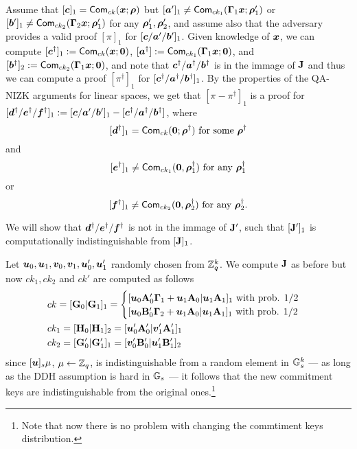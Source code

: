 Assume that $[{\boldsymbol{c}}]_1 = \mathsf{Com}_{ck}({\boldsymbol{x}};{\boldsymbol{\rho}})$ but $[{\boldsymbol{a}}']_1\neq \mathsf{Com}_{ck_1}(\mathbf{{\Gamma}}_1{\boldsymbol{x}};{\boldsymbol{\rho}}'_1)$ or $[{\boldsymbol{b}}']_1\neq \mathsf{Com}_{ck_2}(\mathbf{{\Gamma}}_2{\boldsymbol{x}};{\boldsymbol{\rho}}'_1)$ for any ${\boldsymbol{\rho}}'_1,{\boldsymbol{\rho}}'_2$, and assume also that the adversary provides a valid proof $[\pi]_1$ for $[{\boldsymbol{c}}/{\boldsymbol{a}}'/{\boldsymbol{b}}']_1$. Given knowledge of ${\boldsymbol{x}}$, we can compute $[{\boldsymbol{c}}^\dag]_1:=\mathsf{Com}_{ck}({\boldsymbol{x}};{\boldsymbol{0}})$, $[{\boldsymbol{a}}^\dag]:=\mathsf{Com}_{ck_1}(\mathbf{{\Gamma}}_1{\boldsymbol{x}};{\boldsymbol{0}})$, and $[{\boldsymbol{b}}^\dag]_2:=\mathsf{Com}_{ck_2}(\mathbf{{\Gamma}}_1{\boldsymbol{x}};{\boldsymbol{0}})$, and note that ${\boldsymbol{c}}^\dag/{\boldsymbol{a}}^\dag/{\boldsymbol{b}}^\dag$ is in the immage of $\mathbf{{J}}$ and thus we can compute a proof $[\pi^\dag]_1$ for $[{\boldsymbol{c}}^\dag/{\boldsymbol{a}}^\dag/{\boldsymbol{b}}^\dag]_1$. By the properties of the QA-NIZK arguments for linear spaces, we get that $[\pi-\pi^\dag]_1$ is a proof for $[{\boldsymbol{d}}^\dag/{\boldsymbol{e}}^\dag/{\boldsymbol{f}}^\dag]_1:=[{\boldsymbol{c}}/{\boldsymbol{a}}'/{\boldsymbol{b}}']_1-[{\boldsymbol{c}}^\dag/{\boldsymbol{a}}^\dag/{\boldsymbol{b}}^\dag]$, where
$$[{\boldsymbol{d}}^\dag]_1 = \mathsf{Com}_{ck}({\boldsymbol{0}};{\boldsymbol{\rho}}^\dag)\text{ for some }{\boldsymbol{\rho}}^\dag$$
and
$$[{\boldsymbol{e}}^\dag]_1 \neq\mathsf{Com}_{ck_1}({\boldsymbol{0}},{\boldsymbol{\rho}}^\dag_1) \text{ for any }{\boldsymbol{\rho}}^\dag_1$$ 
or
$$[{\boldsymbol{f}}^\dag]_1 \neq\mathsf{Com}_{ck_2}({\boldsymbol{0}},{\boldsymbol{\rho}}^\dag_2) \text{ for any }{\boldsymbol{\rho}}_2^\dag.$$

We will show that ${\boldsymbol{d}}^\dag/ {\boldsymbol{e}}^\dag/ {\boldsymbol{f}}^\dag$ is not in the immage of $\mathbf{{J}}'$, such that $[\mathbf{{J}}']_1$ is computationally indistinguishable from $[\mathbf{{J}}]_1$.

Let ${\boldsymbol{u}}_0,{\boldsymbol{u}}_1,{\boldsymbol{v}}_0,{\boldsymbol{v}}_1,{\boldsymbol{u}}'_0,{\boldsymbol{u}}'_1$ randomly chosen from $\mathbb{Z}_q^k$. We compute $\mathbf{{J}}$ as before but now $ck_1,ck_2$ and $ck'$ are computed as follows
\begin{align}
&ck = [\matr{G}_0|\matr{G}_1]_1 =
\begin{cases}
[\vecb{u}_0\matr{A}'_{0}\matr{\Gamma}_1+\vecb{u}_1\matr{A}_0|\vecb{u}_1\matr{A}_1]_1 \text{ with prob. } 1/2\\
[\vecb{u}_0\matr{B}'_{0}\matr{\Gamma}_2+\vecb{u}_1\matr{A}_0|\vecb{u}_1\matr{A}_1]_1 \text{ with prob. } 1/2
\end{cases}
\nonumber \\
&ck_1 = [\matr{H}_0|\matr{H}_1]_2 = [\vecb{u}'_0\matr{A}'_{0}|\vecb{v}'_1\matr{A}'_1]_1 \nonumber \\
&ck_2=  [\matr{G}'_0|\matr{G}'_1]_1 = [\vecb{v}'_0\matr{B}'_0|\vecb{u}'_1\matr{B}'_1]_2 \label{eq:ck-dist}
\end{align}
since $[{\boldsymbol{u}}]_s\mu$, $\mu\gets \mathbb{Z}_q$, is indistinguishable from a random element in $\mathbb{G}_s^k$ --- as long as the DDH assumption is hard in $\mathbb{G}_s$ --- it follows that the new commitment keys are indistinguishable from the original ones.\footnote{Note that now there is no problem with changing the commtiment keys distribution.}

